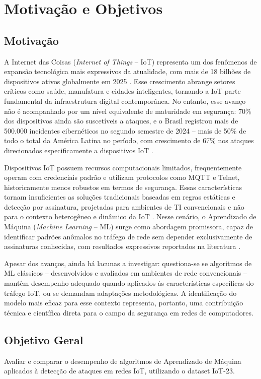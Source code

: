 \chapter{Motivação e Objetivos}\label{chap:problema}
\section{Motivação}\label{sec:motivacao}
A Internet das Coisas (\textit{Internet of Things} -- IoT) representa um dos fenômenos de expansão tecnológica mais expressivos da atualidade, com mais de 18 bilhões de dispositivos ativos globalmente em 2025 \citep{IoTBreakthrough2025}. Esse crescimento abrange setores críticos como saúde, manufatura e cidades inteligentes, tornando a IoT parte fundamental da infraestrutura digital contemporânea. No entanto, esse avanço não é acompanhado por um nível equivalente de maturidade em segurança: 70\% dos dispositivos ainda são suscetíveis a ataques, e o Brasil registrou mais de 500.000 incidentes cibernéticos no segundo semestre de 2024 -- mais de 50\% de todo o total da América Latina no período, com crescimento de 67\% nos ataques direcionados especificamente a dispositivos IoT \citep{NETSCOUT2025}.

Dispositivos IoT possuem recursos computacionais limitados, frequentemente operam com credenciais padrão e utilizam protocolos como MQTT e Telnet, historicamente menos robustos em termos de segurança. Essas características tornam insuficientes as soluções tradicionais baseadas em regras estáticas e detecção por assinatura, projetadas para ambientes de TI convencionais e não para o contexto heterogêneo e dinâmico da IoT \citep{Alfahaid2025}. Nesse cenário, o Aprendizado de Máquina (\textit{Machine Learning} -- ML) surge como abordagem promissora, capaz de identificar padrões anômalos no tráfego de rede sem depender exclusivamente de assinaturas conhecidas, com resultados expressivos reportados na literatura \citep{SouzaArima2024, Bochie2020}.

Apesar dos avanços, ainda há lacunas a investigar: questiona-se se algoritmos de ML clássicos -- desenvolvidos e avaliados em ambientes de rede convencionais -- mantêm desempenho adequado quando aplicados às características específicas do tráfego IoT, ou se demandam adaptações metodológicas. A identificação do modelo mais eficaz para esse contexto representa, portanto, uma contribuição técnica e científica direta para o campo da segurança em redes de computadores.

\section{Objetivo Geral}\label{sec:obj_geral}
Avaliar e comparar o desempenho de algoritmos de Aprendizado de Máquina aplicados à detecção de ataques em redes IoT, utilizando o dataset IoT-23.

